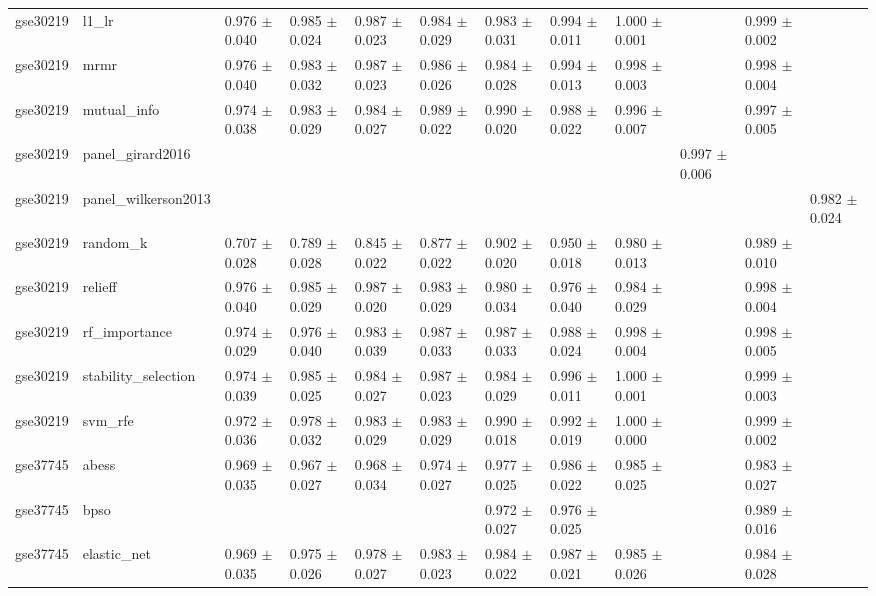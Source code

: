 \begin{table}[t]
\begin{tabular}{llllllllllll}
    gse30219 & l1\_lr & 0.976 $\pm$ 0.040 & 0.985 $\pm$ 0.024 & 0.987 $\pm$ 0.023 & 0.984 $\pm$ 0.029 & 0.983 $\pm$ 0.031 & 0.994 $\pm$ 0.011 & 1.000 $\pm$ 0.001 &  & 0.999 $\pm$ 0.002 &  \\
    gse30219 & mrmr & 0.976 $\pm$ 0.040 & 0.983 $\pm$ 0.032 & 0.987 $\pm$ 0.023 & 0.986 $\pm$ 0.026 & 0.984 $\pm$ 0.028 & 0.994 $\pm$ 0.013 & 0.998 $\pm$ 0.003 &  & 0.998 $\pm$ 0.004 &  \\
    gse30219 & mutual\_info & 0.974 $\pm$ 0.038 & 0.983 $\pm$ 0.029 & 0.984 $\pm$ 0.027 & 0.989 $\pm$ 0.022 & 0.990 $\pm$ 0.020 & 0.988 $\pm$ 0.022 & 0.996 $\pm$ 0.007 &  & 0.997 $\pm$ 0.005 &  \\
    gse30219 & panel\_girard2016 &  &  &  &  &  &  &  & 0.997 $\pm$ 0.006 &  &  \\
    gse30219 & panel\_wilkerson2013 &  &  &  &  &  &  &  &  &  & 0.982 $\pm$ 0.024 \\
    gse30219 & random\_k & 0.707 $\pm$ 0.028 & 0.789 $\pm$ 0.028 & 0.845 $\pm$ 0.022 & 0.877 $\pm$ 0.022 & 0.902 $\pm$ 0.020 & 0.950 $\pm$ 0.018 & 0.980 $\pm$ 0.013 &  & 0.989 $\pm$ 0.010 &  \\
    gse30219 & relieff & 0.976 $\pm$ 0.040 & 0.985 $\pm$ 0.029 & 0.987 $\pm$ 0.020 & 0.983 $\pm$ 0.029 & 0.980 $\pm$ 0.034 & 0.976 $\pm$ 0.040 & 0.984 $\pm$ 0.029 &  & 0.998 $\pm$ 0.004 &  \\
    gse30219 & rf\_importance & 0.974 $\pm$ 0.029 & 0.976 $\pm$ 0.040 & 0.983 $\pm$ 0.039 & 0.987 $\pm$ 0.033 & 0.987 $\pm$ 0.033 & 0.988 $\pm$ 0.024 & 0.998 $\pm$ 0.004 &  & 0.998 $\pm$ 0.005 &  \\
    gse30219 & stability\_selection & 0.974 $\pm$ 0.039 & 0.985 $\pm$ 0.025 & 0.984 $\pm$ 0.027 & 0.987 $\pm$ 0.023 & 0.984 $\pm$ 0.029 & 0.996 $\pm$ 0.011 & 1.000 $\pm$ 0.001 &  & 0.999 $\pm$ 0.003 &  \\
    gse30219 & svm\_rfe & 0.972 $\pm$ 0.036 & 0.978 $\pm$ 0.032 & 0.983 $\pm$ 0.029 & 0.983 $\pm$ 0.029 & 0.990 $\pm$ 0.018 & 0.992 $\pm$ 0.019 & 1.000 $\pm$ 0.000 &  & 0.999 $\pm$ 0.002 &  \\
    gse37745 & abess & 0.969 $\pm$ 0.035 & 0.967 $\pm$ 0.027 & 0.968 $\pm$ 0.034 & 0.974 $\pm$ 0.027 & 0.977 $\pm$ 0.025 & 0.986 $\pm$ 0.022 & 0.985 $\pm$ 0.025 &  & 0.983 $\pm$ 0.027 &  \\
    gse37745 & bpso &  &  &  &  & 0.972 $\pm$ 0.027 & 0.976 $\pm$ 0.025 &  &  & 0.989 $\pm$ 0.016 &  \\
    gse37745 & elastic\_net & 0.969 $\pm$ 0.035 & 0.975 $\pm$ 0.026 & 0.978 $\pm$ 0.027 & 0.983 $\pm$ 0.023 & 0.984 $\pm$ 0.022 & 0.987 $\pm$ 0.021 & 0.985 $\pm$ 0.026 &  & 0.984 $\pm$ 0.028 &  \\

\end{tabular}
\end{table}
